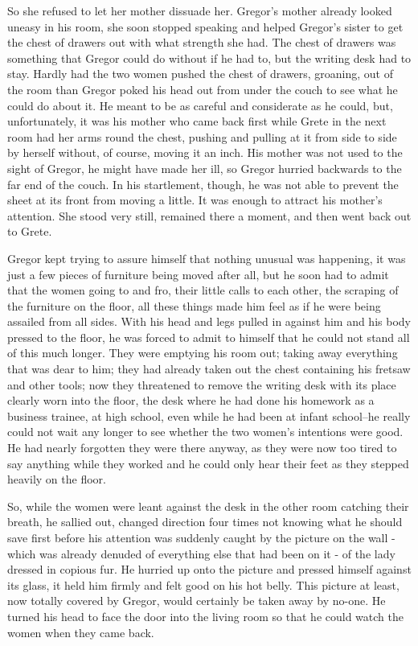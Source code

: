 \documentclass[12pt]{book}
\begin{document}
    So she refused to let her mother dissuade her. Gregor's mother already looked uneasy in his room, she soon stopped speaking and helped Gregor's sister to get the chest of drawers out with what strength she had. The chest of drawers was something that Gregor could do without if he had to, but the writing desk had to stay. Hardly had the two women pushed the chest of drawers, groaning, out of the room than Gregor poked his head out from under the couch to see what he could do about it. He meant to be as careful and considerate as he could, but, unfortunately, it was his mother who came back first while Grete in the next room had her arms round the chest, pushing and pulling at it from side to side by herself without, of course, moving it an inch. His mother was not used to the sight of Gregor, he might have made her ill, so Gregor hurried backwards to the far end of the couch. In his startlement, though, he was not able to prevent the sheet at its front from moving a little. It was enough to attract his mother's attention. She stood very still, remained there a moment, and then went back out to Grete.

    Gregor kept trying to assure himself that nothing unusual was happening, it was just a few pieces of furniture being moved after all, but he soon had to admit that the women going to and fro, their little calls to each other, the scraping of the furniture on the floor, all these things made him feel as if he were being assailed from all sides. With his head and legs pulled in against him and his body pressed to the floor, he was forced to admit to himself that he could not stand all of this much longer. They were emptying his room out; taking away everything that was dear to him; they had already taken out the chest containing his fretsaw and other tools; now they threatened to remove the writing desk with its place clearly worn into the floor, the desk where he had done his homework as a business trainee, at high school, even while he had been at infant school--he really could not wait any longer to see whether the two women's intentions were good. He had nearly forgotten they were there anyway, as they were now too tired to say anything while they worked and he could only hear their feet as they stepped heavily on the floor.

    So, while the women were leant against the desk in the other room catching their breath, he sallied out, changed direction four times not knowing what he should save first before his attention was suddenly caught by the picture on the wall - which was already denuded of everything else that had been on it - of the lady dressed in copious fur. He hurried up onto the picture and pressed himself against its glass, it held him firmly and felt good on his hot belly. This picture at least, now totally covered by Gregor, would certainly be taken away by no-one. He turned his head to face the door into the living room so that he could watch the women when they came back.
\end{document}
